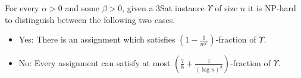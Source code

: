 \begin{corollary}
  For every $\alpha > 0$ and some $\beta > 0$, given a {\sc 3Sat}
  instance $\Upsilon$ of size $n$ it is {\sf NP}-hard to distinguish
  between the following two cases.
\begin{itemize}
\item {\sf Yes:} There is an assignment which satisfies $(1 -
    \frac{1}{n^{\alpha'}})$-fraction of $\Upsilon$.
\item {\sf No:} Every assignment can satisfy at most $(\frac{7}{8} +
    \frac{1}{(\log n)^{\beta}})$-fraction of $\Upsilon$.
\end{itemize}
\end{corollary}





















